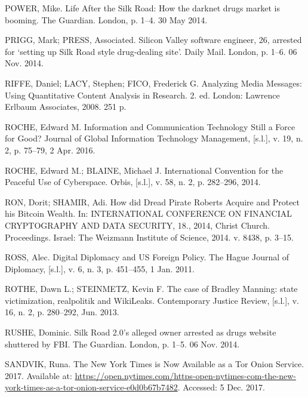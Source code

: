 \begin{list}{}{\setlength{\leftmargin}{0pt}\setlength{\itemsep}{6pt}\setlength{\parsep}{0pt}}
\item POWER, Mike. Life After the Silk Road: How the darknet drugs market is booming. The Guardian. London, p. 1--4. 30 May 2014.

\item PRIGG, Mark; PRESS, Associated. Silicon Valley software engineer, 26, arrested for `setting up Silk Road style drug-dealing site'. Daily Mail. London, p. 1--6. 06 Nov. 2014.

\item RIFFE, Daniel; LACY, Stephen; FICO, Frederick G. Analyzing Media Messages: Using Quantitative Content Analysis in Research. 2. ed. London: Lawrence Erlbaum Associates, 2008. 251 p.

\item ROCHE, Edward M. Information and Communication Technology Still a Force for Good? Journal of Global Information Technology Management, [s.l.], v. 19, n. 2, p. 75--79, 2 Apr. 2016.

\item ROCHE, Edward M.; BLAINE, Michael J. International Convention for the Peaceful Use of Cyberspace. Orbis, [s.l.], v. 58, n. 2, p. 282--296, 2014.

\item RON, Dorit; SHAMIR, Adi. How did Dread Pirate Roberts Acquire and Protect his Bitcoin Wealth. In: INTERNATIONAL CONFERENCE ON FINANCIAL CRYPTOGRAPHY AND DATA SECURITY, 18., 2014, Christ Church. Proceedings. Israel: The Weizmann Institute of Science, 2014. v. 8438, p. 3--15.

\item ROSS, Alec. Digital Diplomacy and US Foreign Policy. The Hague Journal of Diplomacy, [s.l.], v. 6, n. 3, p. 451--455, 1 Jan. 2011.

\item ROTHE, Dawn L.; STEINMETZ, Kevin F. The case of Bradley Manning: state victimization, realpolitik and WikiLeaks. Contemporary Justice Review, [s.l.], v. 16, n. 2, p. 280--292, Jun. 2013.

\item RUSHE, Dominic. Silk Road 2.0's alleged owner arrested as drugs website shuttered by FBI. The Guardian. London, p. 1--5. 06 Nov. 2014.

\item SANDVIK, Runa. The New York Times is Now Available as a Tor Onion Service. 2017. Available at: \url{https://open.nytimes.com/https-open-nytimes-com-the-new-york-times-as-a-tor-onion-service-e0d0b67b7482}. Accessed: 5 Dec. 2017.


\end{list}
